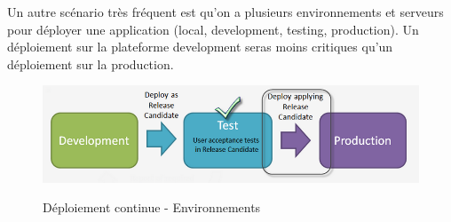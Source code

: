 Un autre scénario très fréquent est qu'on a plusieurs environnements et serveurs pour déployer une application (local, development, testing, production). Un déploiement sur la plateforme development seras moins critiques qu'un déploiement sur la production.

\begin{figure}[H]
\centering
\includegraphics[width=15cm]{bilder/Deployment_ci}
\caption{Déploiement continue - Environnements}\cite{bizagigraphique}
\label{fig:continousdelivery}
\end{figure}